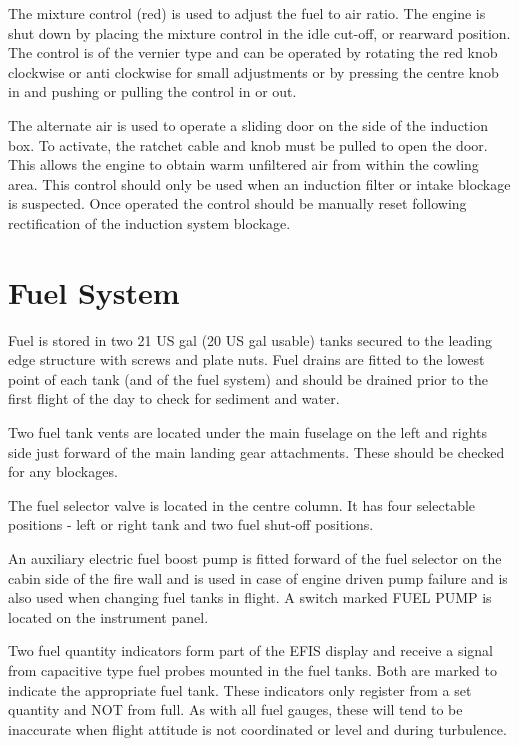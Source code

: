 The mixture control (red) is used to adjust the fuel to air ratio. The engine is shut down by placing the mixture
control in the idle cut-off, or rearward position. The control is of the vernier type and can be operated by rotating
the red knob clockwise or anti clockwise for small adjustments or by pressing the centre knob in and pushing or
pulling the control in or out.


The alternate air is used to operate a sliding door on the side of the induction box. To activate, the ratchet cable
and knob must be pulled to open the door. This allows the engine to obtain warm unfiltered air from within the
cowling area. This control should only be used when an induction filter or intake blockage is suspected. Once
operated the control should be manually reset following rectification of the induction system blockage.

\section{Fuel System}
Fuel is stored in two 21 US gal (20 US gal usable) tanks secured to the leading edge structure with screws and
plate nuts. Fuel drains are fitted to the lowest point of each tank (and of the fuel system) and should be drained
prior to the first flight of the day to check for sediment and water.

Two fuel tank vents are located under the main fuselage on the left and rights side just forward of the main
landing gear attachments. These should be checked for any blockages.

The fuel selector valve is located in the centre column. It has four selectable positions - left or right tank and two
fuel shut-off positions.

An auxiliary electric fuel boost pump is fitted forward of the fuel selector on the cabin side of the fire wall and is
used in case of engine driven pump failure and is also used %
when changing fuel
tanks in flight. A switch marked FUEL PUMP is located on the instrument panel.

Two fuel quantity indicators form part of the EFIS display and receive a signal from capacitive type fuel
probes mounted in the fuel tanks. Both are marked to indicate the appropriate fuel tank. These indicators only
register from a set quantity and NOT from full. As with all fuel gauges, these will tend to be inaccurate
when flight attitude is not coordinated or level and during turbulence.

